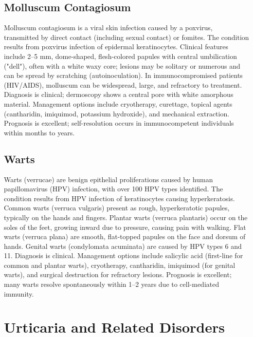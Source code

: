\subsection{Molluscum Contagiosum}
\label{sec:Molluscum Contagiosum}
Molluscum contagiosum is a viral skin infection caused by a poxvirus, transmitted by direct contact (including sexual contact) or fomites. The condition results from poxvirus infection of epidermal keratinocytes. Clinical features include 2--5 mm, dome-shaped, flesh-colored papules with central umbilication ("dell"), often with a white waxy core; lesions may be solitary or numerous and can be spread by scratching (autoinoculation). In immunocompromised patients (HIV/AIDS), molluscum can be widespread, large, and refractory to treatment. Diagnosis is clinical; dermoscopy shows a central pore with white amorphous material. Management options include cryotherapy, curettage, topical agents (cantharidin, imiquimod, potassium hydroxide), and mechanical extraction. Prognosis is excellent; self-resolution occurs in immunocompetent individuals within months to years.

\subsection{Warts}
\label{sec:Warts}
Warts (verrucae) are benign epithelial proliferations caused by human papillomavirus (HPV) infection, with over 100 HPV types identified. The condition results from HPV infection of keratinocytes causing hyperkeratosis. Common warts (verruca vulgaris) present as rough, hyperkeratotic papules, typically on the hands and fingers. Plantar warts (verruca plantaris) occur on the soles of the feet, growing inward due to pressure, causing pain with walking. Flat warts (verruca plana) are smooth, flat-topped papules on the face and dorsum of hands. Genital warts (condylomata acuminata) are caused by HPV types 6 and 11. Diagnosis is clinical. Management options include salicylic acid (first-line for common and plantar warts), cryotherapy, cantharidin, imiquimod (for genital warts), and surgical destruction for refractory lesions. Prognosis is excellent; many warts resolve spontaneously within 1--2 years due to cell-mediated immunity.

\section{Urticaria and Related Disorders}

